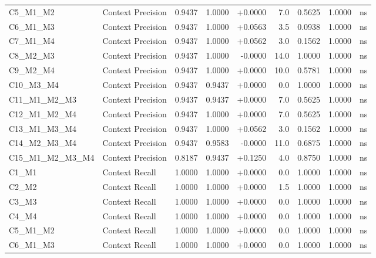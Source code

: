 \begin{table}[p]
\begin{tabular*}{\textwidth}{@{\extracolsep{\fill}} l l r r r r r r c @{}}
\addlinespace
C5\_M1\_M2      & Context Precision    & 0.9437 & 1.0000 & +0.0000 & 7.0 & 0.5625 & 1.0000 & ns \\
\addlinespace
C6\_M1\_M3      & Context Precision    & 0.9437 & 1.0000 & +0.0563 & 3.5 & 0.0938 & 1.0000 & ns \\
\addlinespace
C7\_M1\_M4      & Context Precision    & 0.9437 & 1.0000 & +0.0562 & 3.0 & 0.1562 & 1.0000 & ns \\
\addlinespace
C8\_M2\_M3      & Context Precision    & 0.9437 & 1.0000 & -0.0000 & 14.0 & 1.0000 & 1.0000 & ns \\
\addlinespace
C9\_M2\_M4      & Context Precision    & 0.9437 & 1.0000 & +0.0000 & 10.0 & 0.5781 & 1.0000 & ns \\
\addlinespace
C10\_M3\_M4     & Context Precision    & 0.9437 & 0.9437 & +0.0000 & 0.0 & 1.0000 & 1.0000 & ns \\
\addlinespace
C11\_M1\_M2\_M3 & Context Precision    & 0.9437 & 0.9437 & +0.0000 & 7.0 & 0.5625 & 1.0000 & ns \\
\addlinespace
C12\_M1\_M2\_M4 & Context Precision    & 0.9437 & 1.0000 & +0.0000 & 7.0 & 0.5625 & 1.0000 & ns \\
\addlinespace
C13\_M1\_M3\_M4 & Context Precision    & 0.9437 & 1.0000 & +0.0562 & 3.0 & 0.1562 & 1.0000 & ns \\
\addlinespace
C14\_M2\_M3\_M4 & Context Precision    & 0.9437 & 0.9583 & -0.0000 & 11.0 & 0.6875 & 1.0000 & ns \\
\addlinespace
C15\_M1\_M2\_M3\_M4 & Context Precision    & 0.8187 & 0.9437 & +0.1250 & 4.0 & 0.8750 & 1.0000 & ns \\
\addlinespace
C1\_M1          & Context Recall       & 1.0000 & 1.0000 & +0.0000 & 0.0 & 1.0000 & 1.0000 & ns \\
\addlinespace
C2\_M2          & Context Recall       & 1.0000 & 1.0000 & +0.0000 & 1.5 & 1.0000 & 1.0000 & ns \\
\addlinespace
C3\_M3          & Context Recall       & 1.0000 & 1.0000 & +0.0000 & 0.0 & 1.0000 & 1.0000 & ns \\
\addlinespace
C4\_M4          & Context Recall       & 1.0000 & 1.0000 & +0.0000 & 0.0 & 1.0000 & 1.0000 & ns \\
\addlinespace
C5\_M1\_M2      & Context Recall       & 1.0000 & 1.0000 & +0.0000 & 0.0 & 1.0000 & 1.0000 & ns \\
\addlinespace
C6\_M1\_M3      & Context Recall       & 1.0000 & 1.0000 & +0.0000 & 0.0 & 1.0000 & 1.0000 & ns \\

\end{tabular*}
\end{table}
